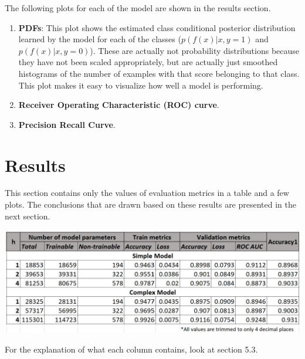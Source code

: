 \documentclass[twoside]{article}
\begin{document}
	The following plots for each of the model are shown in the results section.
	
	\begin{enumerate}
		\item \textbf{PDFs}: This plot shows the estimated class conditional posterior distribution learned by the model for each of the classes ($p(f(x)|x,y=1)$ and $p(f(x)|x,y=0)$). These are actually not probability distributions because they have not been scaled appropriately, but are actually just smoothed histograms of the number of examples with that score belonging to that class. This plot makes it easy to visualize how well a model is performing.
		\item \textbf{Receiver Operating Characteristic (ROC) curve}.
		\item \textbf{Precision Recall Curve}.
	\end{enumerate}
	
	\newpage
	
	
	\section{Results}
	This section contains only the values of evaluation metrics in a table and a few plots. The conclusions that are drawn based on these results are presented in the next section.
	
	\includegraphics{res/img/table.jpg}
	
	For the explanation of what each column contains, look at section 5.3.

	\newpage
	
\end{document}
